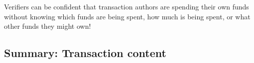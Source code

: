 Verifiers can be confident that transaction authors are spending their own funds without knowing which funds are being spent, how much is being spent, or what other funds they might own!


\newpage
\subsection{Summary: Transaction content}
\label{subsec:ringct-tx-content-summary}
\fi

